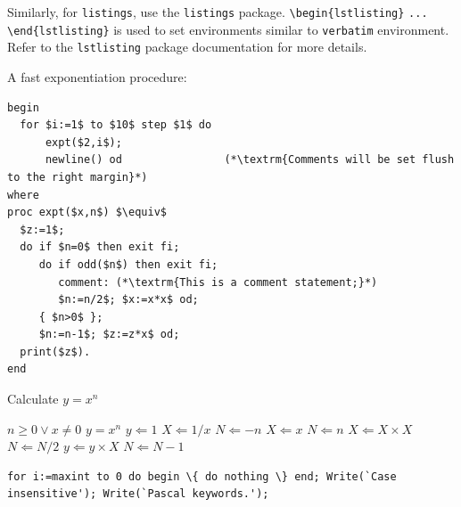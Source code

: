 \documentclass[sn-basic,pdflatex]{sn-jnl}
\theoremstyle{remark}
\theoremstyle{definition}
\begin{document}
Similarly, for \texttt{listings}, use the \texttt{listings} package.
\texttt{\textbackslash{}begin\{lstlisting\}} \texttt{...}
\texttt{\textbackslash{}end\{lstlisting\}} is used to set environments
similar to \texttt{verbatim} environment. Refer to the
\texttt{lstlisting} package documentation for more details.

A fast exponentiation procedure:

\begin{lstlisting}
begin
  for $i:=1$ to $10$ step $1$ do
      expt($2,i$);  
      newline() od                (*\textrm{Comments will be set flush to the right margin}*)
where
proc expt($x,n$) $\equiv$
  $z:=1$;
  do if $n=0$ then exit fi;
     do if odd($n$) then exit fi;                 
        comment: (*\textrm{This is a comment statement;}*)
        $n:=n/2$; $x:=x*x$ od;
     { $n>0$ };
     $n:=n-1$; $z:=z*x$ od;
  print($z$). 
end
\end{lstlisting}

\begin{algorithm}
\caption{Calculate $y = x^n$}\label{algo1}
\begin{algorithmic}[1]
\Require $n \geq 0 \vee x \neq 0$
\Ensure $y = x^n$ 
\State $y \Leftarrow 1$
\label{algln2}
        \State $X \Leftarrow 1 / x$
        \State $N \Leftarrow -n$
\Else
        \State $X \Leftarrow x$
        \State $N \Leftarrow n$
\EndIf
{}
            \State $X \Leftarrow X \times X$
            \State $N \Leftarrow N / 2$
        \Else[$N$ is odd]
            \State $y \Leftarrow y \times X$
            \State $N \Leftarrow N - 1$
        \EndIf
\EndWhile
\end{algorithmic}
\end{algorithm}

\begin{minipage}{\hsize}

\lstset{frame=single,framexleftmargin=-1pt,framexrightmargin=-17pt,framesep=12pt,linewidth=0.98\textwidth,language=pascal}

\begin{lstlisting}
for i:=maxint to 0 do begin \{ do nothing \} end; Write(`Case
insensitive'); Write(`Pascal keywords.');

\end{lstlisting}

\end{minipage}
\end{document}
